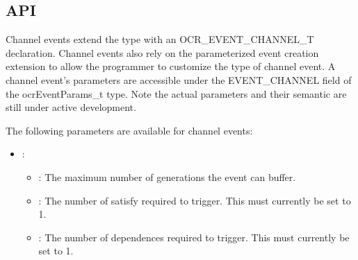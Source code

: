 \subsection{API}

Channel events extend the
\hypertarget{type_ocrEventTypes_t}{} type
with an OCR\_EVENT\_CHANNEL\_T declaration. Channel events also rely
on the parameterized event creation extension to allow the programmer
to customize the type of channel event. A channel event's parameters are
accessible under the EVENT\_CHANNEL field of the ocrEventParams\_t
type. Note the actual parameters and their semantic are still under
active development.

The following parameters are available for channel events:
\begin{itemize}
\item {}:
\begin{itemize}
\item {}: The maximum number of generations the event can buffer.
\item {}: The number of satisfy required to trigger. This
  must currently be set to 1.
\item {}: The number of dependences required to
  trigger. This must currently be set to 1.
\end{itemize}
\end{itemize}
